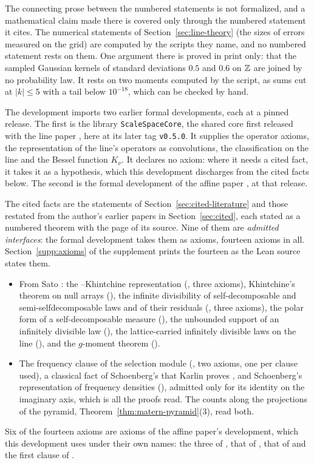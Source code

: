 The connecting prose between the numbered statements is not formalized, and a mathematical claim
made there is covered only through the numbered statement it cites.
The numerical statements of Section~\ref{sec:line-theory} (the sizes of errors measured on the grid)
are computed by the scripts they name, and no numbered statement rests on them. One argument there
is proved in print only: that the sampled Gaussian kernels of standard deviations $0.5$ and $0.6$ on
$\mathbb{Z}$ are joined by no probability law. It rests on two moments computed by the script, as sums cut at
$|k| \le 5$ with a tail below $10^{-18}$, which can be checked by hand.

The development imports two earlier formal developments, each at a pinned release. The first is the
library \texttt{ScaleSpaceCore}, the shared core first released with the line paper
, here at its later tag \texttt{v0.5.0}. It supplies the operator axioms, the representation of the line's operators
as convolutions, the classification on the line and the Bessel function $K_\nu$. It declares no
axiom: where it needs a cited fact, it takes it as a hypothesis, which this development discharges
from the cited facts below. The second is the formal development of the affine paper
, at that release.

The cited facts are the statements of Section~\ref{sec:cited-literature} and those restated from the
author's earlier papers in Section~\ref{sec:cited}, each stated as a numbered theorem with the page of
its source. Nine of them are \emph{admitted interfaces}: the formal development takes them as
axioms, fourteen axioms in all. Section~\ref{supp:axioms} of the supplement prints the fourteen as
the Lean source states them.
\begin{itemize}
\item From Sato \cite{sato1999levy}: the \Levy{}--Khintchine representation
(, three axioms), Khintchine's theorem on null arrays (), the infinite divisibility of self-decomposable and
semi-selfdecomposable laws and of their residuals (, three axioms), the polar form of a
self-decomposable \Levy{} measure (), the unbounded support of an infinitely divisible
law (), the lattice-carried infinitely divisible laws on the line (), and the
$g$-moment theorem ().
\item The \Polya{} frequency clause of the selection module 
(, two axioms, one per clause used), a classical fact of Schoenberg's that Karlin
proves \cite{karlin1968total}, and Schoenberg's representation of \Polya{}
frequency densities (), admitted only for its identity on the imaginary axis, which is
all the proofs read. The counts along the projections of the \Matern{} pyramid,
Theorem~\ref{thm:matern-pyramid}(3), read both.
\end{itemize}
Six of the fourteen axioms are axioms of the affine paper's development, which this development
uses under their own names: the three of , that of , that of 
and the first clause of .

